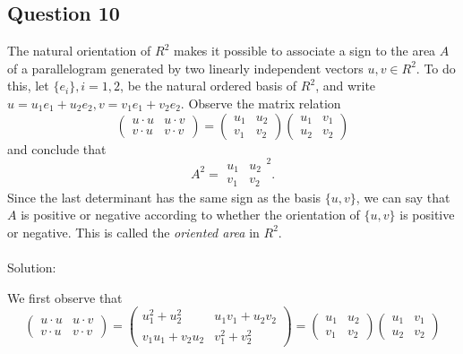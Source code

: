 \documentclass[12pt]{article}
\begin{document}
\subsection*{Question 10}
The natural orientation of $R^2$ makes it possible to associate a sign to the area $A$ of a parallelogram generated by two linearly independent vectors $u,v \in R^2$. To do this, let $\{e_i\}, i = 1, 2$, be the natural ordered basis of $R^2$, and write $u = u_1e_1 +u_2e_2, v = v_1e_1 +v_2e_2$. Observe the matrix relation \begin{equation*}
    \begin{pmatrix}
    u \cdot u & u \cdot v\\
    v \cdot u & v \cdot v
    \end{pmatrix} =
    \begin{pmatrix}
    u_1 & u_2\\
    v_1 & v_2
    \end{pmatrix}
    \begin{pmatrix}
    u_1 & v_1\\
    u_2 & v_2
    \end{pmatrix}
\end{equation*}
and conclude that \begin{equation*}
    A^2 = \begin{array}{|cc|}
         u_1 & u_2\\
         v_1 & v_2
    \end{array}^2.
\end{equation*}
Since the last determinant has the same sign as the basis $\{u,v\}$, we can say that $A$ is positive or negative according to whether the orientation of $\{u,v\}$ is positive or negative. This is called the \textit{oriented area} in $R^2$.\\\\
Solution:


We first observe that
  \begin{equation*}
     \begin{pmatrix}
     u \cdot u & u \cdot v\\
     v \cdot u & v \cdot v
     \end{pmatrix} =
     \begin{pmatrix}
          u_1^2 + u_2^2 & u_1v_1 + u_2v_2\\
          v_1u_1 + v_2u_2 & v_1^2 + v^2_2
     \end{pmatrix} = 
     \begin{pmatrix}
     u_1 & u_2\\
     v_1 & v_2
     \end{pmatrix}
     \begin{pmatrix}
     u_1 & v_1\\
     u_2 & v_2
     \end{pmatrix}
 \end{equation*}
\end{document}
